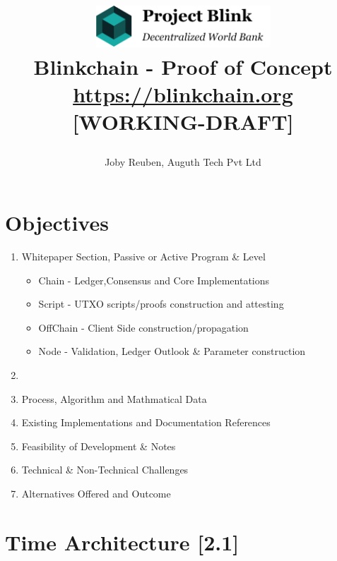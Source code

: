 \documentclass[a4paper,11pt]{article}
\title{

\centering
\includegraphics[width=6.5cm]{logo}\\
\vspace{5mm}
Blinkchain - Proof of Concept\\
\vspace{2mm}
\footnotesize{\url{https://blinkchain.org}}\\
\vspace{3mm}
\small{[WORKING-DRAFT]}}
\author{Joby Reuben, Auguth Tech Pvt Ltd}
\date{\vspace{-5ex}}
\begin{document}
\maketitle

\tableofcontents


\section{Objectives}

\begin{enumerate}
\item Whitepaper Section, Passive or Active Program \& Level
\begin{itemize}
\item Chain - Ledger,Consensus and Core Implementations
\item Script - UTXO scripts/proofs construction and attesting
\item OffChain - Client Side construction/propagation
\item Node - Validation, Ledger Outlook \& Parameter construction
\end{itemize}
\item 
\item Process, Algorithm and Mathmatical Data
\item Existing Implementations and Documentation References
\item Feasibility of Development \& Notes
\item Technical \& Non-Technical Challenges
\item Alternatives Offered and Outcome
\end{enumerate}

\section{Time Architecture [2.1]}
\end{document}

